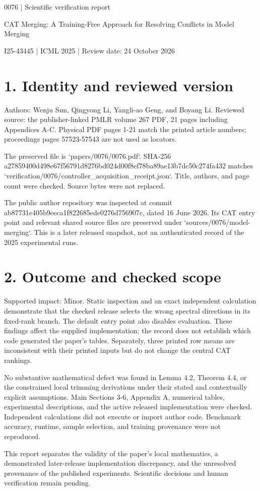 \documentclass[10pt]{article}
\begin{document}
0076 | Scientific verification report\par
CAT Merging: A Training-Free Approach for Resolving Conflicts in Model Merging\par
I25-43445 | ICML 2025 | Review date: 24 October 2026\par
\section*{1. Identity and reviewed version}
Authors: Wenju Sun, Qingyong Li, Yangli-ao Geng, and Boyang Li. Reviewed source: the publisher-linked PMLR volume 267 PDF, 21 pages including Appendices A-C. Physical PDF pages 1-21 match the printed article numbers; proceedings pages 57523-57543 are not used as locators.\par
The preserved file is `papers/0076/0076.pdf`. SHA-256 a27859400d498e67f56791d8276bd024d00f8ef78ba89ae13b7dc50c274fa432 matches `verification/0076/controller\_acquisition\_receipt.json`. Title, authors, and page count were checked. Source bytes were not replaced.\par
The public author repository was inspected at commit ab87731e405b9eeca1f822685ede0276d756907c, dated 16 June 2026. Its CAT entry point and relevant shared source files are preserved under `sources/0076/model-merging`. This is a later released snapshot, not an authenticated record of the 2025 experimental runs.\par
\section*{2. Outcome and checked scope}
Supported impact: Minor. Static inspection and an exact independent calculation demonstrate that the checked release selects the wrong spectral directions in its fixed-rank branch. The default entry point also disables evaluation. These findings affect the supplied implementation; the record does not establish which code generated the paper’s tables. Separately, three printed row means are inconsistent with their printed inputs but do not change the central CAT rankings.\par
No substantive mathematical defect was found in Lemma 4.2, Theorem 4.4, or the constrained local trimming derivations under their stated and contextually explicit assumptions. Main Sections 3-6, Appendix A, numerical tables, experimental descriptions, and the active released implementation were checked. Independent calculations did not execute or import author code. Benchmark accuracy, runtime, sample selection, and training provenance were not reproduced.\par
This report separates the validity of the paper’s local mathematics, a demonstrated later-release implementation discrepancy, and the unresolved provenance of the published experiments. Scientific decisions and human verification remain pending.\par
\end{document}
